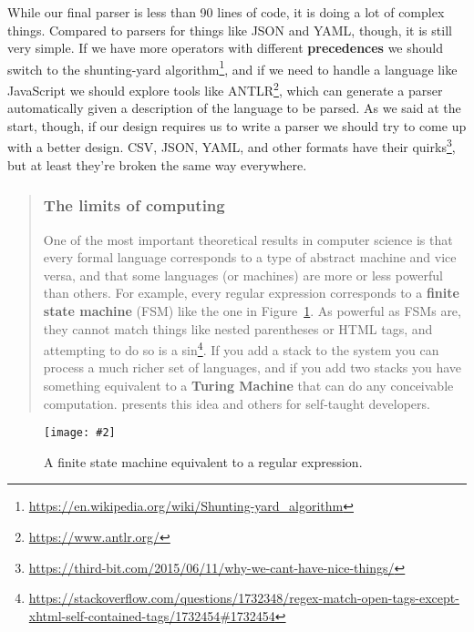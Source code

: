 \documentclass[krantzl]{krantz}
\newcommand{\figpdf}[4]{\begin{figure}%
\centering%
\texttt{[image: \#2]}%
\caption{#3}%
\label{#1}%
\end{figure}}
\newcommand{\figref}[1]{Figure~\ref{#1}}
\newcommand{\glossref}[1]{\textbf{#1}}
\newenvironment{callout}{\savenotes\begin{tBox}\begin{quotation}\toggletrue{inbox}\renewcommand{\thempfootnote}{\arabic{footnote}}}{\end{quotation}\vspace{\baselineskip}\end{tBox}\togglefalse{inbox}\spewnotes}
\newcommand{\hreffoot}[2]{{#1}\footnote{\href{#2}{#2}}}
\begin{document}
While our final parser is less than 90 lines of code,
it is doing a lot of complex things.
Compared to parsers for things like JSON and YAML,
though,
it is still very simple.
If we have more operators with different \glossref{precedences}
we should switch to the \hreffoot{shunting-yard algorithm}{https://en.wikipedia.org/wiki/Shunting-yard\_algorithm},
and if we need to handle a language like JavaScript we should explore tools like \hreffoot{ANTLR}{https://www.antlr.org/},
which can generate a parser automatically given a description of the language to be parsed.
As we said at the start,
though,
if our design requires us to write a parser we should try to come up with a better design.
CSV, JSON, YAML, and other formats \hreffoot{have their quirks}{https://third-bit.com/2015/06/11/why-we-cant-have-nice-things/},
but at least they're broken the same way everywhere.

\begin{callout}


\subsubsection*{The limits of computing}


One of the most important theoretical results in computer science is that
every formal language corresponds to a type of abstract machine and vice versa,
and that some languages (or machines) are more or less powerful than others.
For example,
every regular expression corresponds to a \glossref{finite state machine} (FSM)
like the one in \figref{regex-parser-finite-state-machine}.
As powerful as FSMs are,
they cannot match things like nested parentheses or HTML tags,
and \hreffoot{attempting to do so is a sin}{https://stackoverflow.com/questions/1732348/regex-match-open-tags-except-xhtml-self-contained-tags/1732454\#1732454}.
If you add a stack to the system you can process a much richer set of languages,
and if you add two stacks you have something equivalent to a \glossref{Turing Machine}
that can do any conceivable computation.
\cite{Conery2021} presents this idea and others for self-taught developers.

\end{callout}

\figpdf{regex-parser-finite-state-machine}{./regex-parser/finite-state-machine.pdf}{A finite state machine equivalent to a regular expression.}{0.6}
\end{document}
